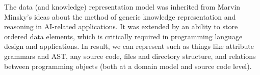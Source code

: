 \label{frame}\secdown

\clearpage

The data (and knowledge) representation model was inherited from Marvin Minsky's
ideas about the method of generic knowledge representation and reasoning in
AI-related applications. It was extended by an ability to store ordered data
elements, which is critically required in programming language design and
applications. In result, we can represent such as things like attribute grammars
and AST, any source code, files and directory structure, and relations between
programming objects (both at a domain model and source code level).








\secup
